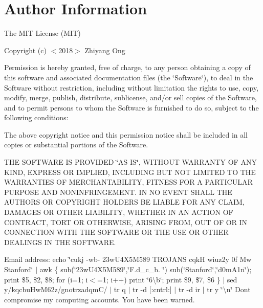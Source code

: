\section*{Author Information}

The M\+I\+T License (M\+I\+T)

Copyright (c) $<$2018$>$ Zhiyang Ong

Permission is hereby granted, free of charge, to any person obtaining a copy of this software and associated documentation files (the \char`\"{}\+Software\char`\"{}), to deal in the Software without restriction, including without limitation the rights to use, copy, modify, merge, publish, distribute, sublicense, and/or sell copies of the Software, and to permit persons to whom the Software is furnished to do so, subject to the following conditions\+:

The above copyright notice and this permission notice shall be included in all copies or substantial portions of the Software.

T\+H\+E S\+O\+F\+T\+W\+A\+R\+E I\+S P\+R\+O\+V\+I\+D\+E\+D \char`\"{}\+A\+S I\+S\char`\"{}, W\+I\+T\+H\+O\+U\+T W\+A\+R\+R\+A\+N\+T\+Y O\+F A\+N\+Y K\+I\+N\+D, E\+X\+P\+R\+E\+S\+S O\+R I\+M\+P\+L\+I\+E\+D, I\+N\+C\+L\+U\+D\+I\+N\+G B\+U\+T N\+O\+T L\+I\+M\+I\+T\+E\+D T\+O T\+H\+E W\+A\+R\+R\+A\+N\+T\+I\+E\+S O\+F M\+E\+R\+C\+H\+A\+N\+T\+A\+B\+I\+L\+I\+T\+Y, F\+I\+T\+N\+E\+S\+S F\+O\+R A P\+A\+R\+T\+I\+C\+U\+L\+A\+R P\+U\+R\+P\+O\+S\+E A\+N\+D N\+O\+N\+I\+N\+F\+R\+I\+N\+G\+E\+M\+E\+N\+T. I\+N N\+O E\+V\+E\+N\+T S\+H\+A\+L\+L T\+H\+E A\+U\+T\+H\+O\+R\+S O\+R C\+O\+P\+Y\+R\+I\+G\+H\+T H\+O\+L\+D\+E\+R\+S B\+E L\+I\+A\+B\+L\+E F\+O\+R A\+N\+Y C\+L\+A\+I\+M, D\+A\+M\+A\+G\+E\+S O\+R O\+T\+H\+E\+R L\+I\+A\+B\+I\+L\+I\+T\+Y, W\+H\+E\+T\+H\+E\+R I\+N A\+N A\+C\+T\+I\+O\+N O\+F C\+O\+N\+T\+R\+A\+C\+T, T\+O\+R\+T O\+R O\+T\+H\+E\+R\+W\+I\+S\+E, A\+R\+I\+S\+I\+N\+G F\+R\+O\+M, O\+U\+T O\+F O\+R I\+N C\+O\+N\+N\+E\+C\+T\+I\+O\+N W\+I\+T\+H T\+H\+E S\+O\+F\+T\+W\+A\+R\+E O\+R T\+H\+E U\+S\+E O\+R O\+T\+H\+E\+R D\+E\+A\+L\+I\+N\+G\+S I\+N T\+H\+E S\+O\+F\+T\+W\+A\+R\+E.

Email address\+: echo \char`\"{}cukj -\/wb-\/ 23w\+U4\+X5\+M589 T\+R\+O\+J\+A\+N\+S cqk\+H wiuz2y 0f Mw Stanford\char`\"{} $\vert$ awk \textquotesingle{}\{ sub(\char`\"{}23w\+U4\+X5\+M589\char`\"{},\char`\"{}\+F.\+d\+\_\+c\+\_\+b. \char`\"{}) sub(\char`\"{}\+Stanford\char`\"{},\char`\"{}d0m\+A1n\char`\"{}); print \$5, \$2, \$8; for (i=1; i$<$=1; i++) print \char`\"{}6\textbackslash{}b\char`\"{}; print \$9, \$7, \$6 \}\textquotesingle{} $\vert$ sed y/kqcbu\+Hw\+M62z/gnotrzadqm\+C/ $\vert$ tr \textquotesingle{}q\textquotesingle{} \textquotesingle{} \textquotesingle{} $\vert$ tr -\/d \mbox{[}\+:cntrl\+:\mbox{]} $\vert$ tr -\/d \textquotesingle{}ir\textquotesingle{} $\vert$ tr y \char`\"{}\textbackslash{}n\char`\"{} Don\textquotesingle{}t compromise my computing accounts. You have been warned. 
